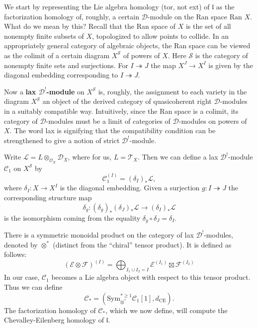 \documentclass{amsart}
\theoremstyle{definition}
\newcommand{\Sym}{\text{Sym}}
\begin{document}
We start by representing the Lie algebra homology (tor, not ext) of 
$\mathfrak{l}$ as the factorization homology of, roughly, a certain 
$\mathcal{D}$-module on the Ran space $\text{Ran } X$. What do we mean by 
this? Recall that the Ran space of $X$ is the set of all nonempty finite 
subsets of $X$, topologized to allow points to collide. In an 
appropriately general category of algebraic objects, the Ran space can 
be viewed as the colimit of a certain diagram $X^\mathcal{S}$ of powers 
of $X$. Here $\mathcal{S}$ is the category of nonempty finite sets and 
surjections. For $I\twoheadrightarrow J$ the map $X^J\to X^I$ is given 
by the diagonal embedding corresponding to $I\twoheadrightarrow J$.

Now a \textbf{lax $\mathcal{D}^!$-module} on $X^\mathcal{S}$ is, roughly, the 
assignment to each variety in the diagram $X^\mathcal{S}$ an object of the 
derived category of quasicoherent right $\mathcal{D}$-modules in a suitably 
compatible way. Intuitively, since the Ran space is a colimit, its category 
of $\mathcal{D}$-modules must be a limit of categories of $\mathcal{D}$-modules 
on powers of $X$. The word lax is signifying that the compatibility condition 
can be strengthened to give a notion of strict $\mathcal{D}^!$-module.

Write $\mathcal{L}=L\otimes_{\mathcal{O}_X}\mathcal{D}_X$, where 
for us, $L=\mathcal{T}_X$.
Then we can define a 
lax $\mathcal{D}^!$-module $\mathcal{C}_1$ on $X^\mathcal{S}$ by
\begin{equation*}
    \mathcal{C}_{1}^{(I)} = (\delta_I)_* \mathcal{L},
\end{equation*}
where $\delta_I: X\to X^I$ is the diagonal embedding.
Given a surjection $g:I\twoheadrightarrow J$ the corresponding structure map
\begin{equation*}
    \delta_g: (\delta_g)_*(\delta_J)_*\mathcal{L} \to (\delta_I)_*\mathcal{L}
\end{equation*}
is the isomorphism coming from the equality $\delta_g\circ\delta_J=\delta_I$.

There is a symmetric monoidal product on the category of lax 
$\mathcal{D}^!$-modules, denoted by $\otimes^*$ (distinct from the ``chiral'' 
tensor product). It is defined as follows:
\begin{equation*}
    (\mathcal{E}\otimes \mathcal{F})^{(I)} = \bigoplus_{I_1\cup I_2=I}
    \mathcal{E}^{(I_1)} \boxtimes \mathcal{F}^{(I_2)}
\end{equation*}
In our case, $\mathcal{C}_1$ becomes a Lie algebra object with respect to this 
tensor product. Thus we can define
\begin{equation*}
    \mathcal{C}_* = (\Sym^{*\geq 1}_{\otimes^*} \mathcal{C}_1[1], 
    d_{\text{CE}}).
\end{equation*}
The factorization homology of $\mathcal{C}_*$, which we now define, will compute 
the Chevalley-Eilenberg homology of $\mathfrak{l}$.
\end{document}
